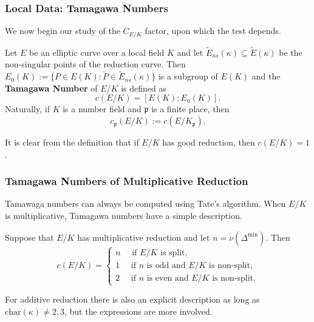 \documentclass{beamer}
\newcommand{\pp}{\mathfrak{p}}
\theoremstyle{plain}
\begin{document}
\begin{frame}
    \frametitle{Local Data: Tamagawa Numbers}
    We now begin our study of the $C_{E/K}$ factor, upon which the test depends. \pause

    \begin{definition}
        Let $E$ be an elliptic curve over a local field $K$ and let $\tilde{E}_{ns}(\kappa)\subseteq \tilde{E}(\kappa)$ be the non-singular points of the reduction curve. Then $E_0(K):=\{P\in E(K):\tilde{P}\in \tilde{E}_{ns}(\kappa)\}$ is a subgroup of $E(K)$ and the \textbf{Tamagawa Number} of $E/K$ is defined as $$c(E/K)=[E(K):E_{0}(K)].$$
        \pause Naturally, if $K$ is a number field and $\pp$ is a finite place, then
        $$c_\pp(E/K):=c(E/K_\pp).$$
    \end{definition} \pause
    It is clear from the definition that if $E/K$ has good reduction, then $c(E/K)=1$.
\end{frame}

\begin{frame}
    \frametitle{Tamagawa Numbers of Multiplicative Reduction}
    Tamawaga numbers can always be computed using Tate's algorithm. When $E/K$ is multiplicative, Tamagawa numbers have a simple description. \pause
    \begin{lemma}
        Suppose that $E/K$ has multiplicative reduction and let $n=\nu(\Delta^{\min})$. \pause Then
        \[
        c(E/K)=
        \begin{cases}
            n\quad \text{ if $E/K$ is split,}\\
            1\quad \text{ if $n$ is odd and $E/K$ is non-split,}\\
            2\quad \text{ if $n$ is even and $E/K$ is non-split.}
        \end{cases}    
        \] 
    \end{lemma}\pause

    For additive reduction there is also an explicit description as long as $\mathrm{char}(\kappa)\neq 2,3$, but the expressions are more involved.

\end{frame}
\end{document}
